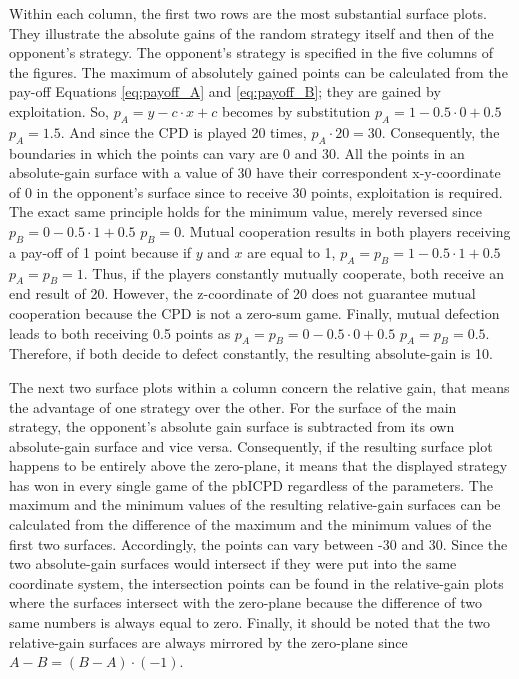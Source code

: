 \documentclass[11pt]{article}
\begin{document}
Within each column, the first two rows are the most substantial surface plots. 
They illustrate the absolute gains of the random strategy itself and then of the opponent’s strategy.
The opponent's strategy is specified in the five columns of the figures.
The maximum of absolutely gained points can be calculated from the pay-off Equations \ref{eq:payoff_A} and \ref{eq:payoff_B}; they are gained by exploitation. 
So, $p_A = y - c \cdot x + c$ becomes by substitution $p_A = 1 - 0.5 \cdot 0 + 0.5$ \textrightarrow $p_A = 1.5$.
And since the CPD is played 20 times, $p_A \cdot 20 = 30$.
Consequently, the boundaries in which the points can vary are 0 and 30. 
All the points in an absolute-gain surface with a value of 30 have their correspondent x-y-coordinate of 0 in the opponent’s surface since to receive 30 points, exploitation is required. 
The exact same principle holds for the minimum value, merely reversed since
$p_B = 0 - 0.5 \cdot 1 + 0.5$ \textrightarrow $p_B = 0$.
Mutual cooperation results in both players receiving a pay-off of 1 point because if $y$ and $x$ are equal to 1, $p_A = p_B = 1 - 0.5 \cdot 1 + 0.5$ \textrightarrow $p_A = p_B = 1$.
Thus, if the players constantly mutually cooperate, both receive an end result of 20.
However, the z-coordinate of 20 does not guarantee mutual cooperation because the CPD is not a zero-sum game.
Finally, mutual defection leads to both receiving 0.5 points as $p_A = p_B = 0 - 0.5 \cdot 0 + 0.5$ \textrightarrow $p_A = p_B = 0.5$.
Therefore, if both decide to defect constantly, the resulting absolute-gain is 10.

The next two surface plots within a column concern the relative gain, that means the advantage of one strategy over the other. 
For the surface of the main strategy, the opponent’s absolute gain surface is subtracted from its own absolute-gain surface and vice versa. 
Consequently, if the resulting surface plot happens to be entirely above the zero-plane, it means that the displayed strategy has won in every single game of the pbICPD regardless of the parameters.
The maximum and the minimum values of the resulting relative-gain surfaces can be calculated from the difference of the maximum and the minimum values of the first two surfaces. 
Accordingly, the points can vary between -30 and 30. 
Since the two absolute-gain surfaces would intersect if they were put into the same coordinate system, the intersection points can be found in the relative-gain plots where the surfaces intersect with the zero-plane because the difference of two same numbers is always equal to zero. 
Finally, it should be noted that the two relative-gain surfaces are always mirrored by the zero-plane since $A - B = (B - A) \cdot (-1)$.
\end{document}

